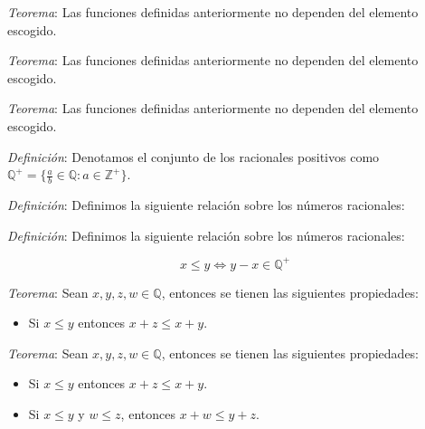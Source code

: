 \documentclass{beamer}
\begin{document}
  \begin{frame}
    \textit{Teorema}: Las funciones definidas anteriormente no dependen del elemento 
    escogido.
  \end{frame}

  \begin{frame}
    \textit{Teorema}: Las funciones definidas anteriormente no dependen del elemento 
    escogido.
  \end{frame}

  \begin{frame}
    \textit{Teorema}: Las funciones definidas anteriormente no dependen del elemento 
    escogido.
    \newline\newline

    \textit{Definición}: Denotamos el conjunto de los racionales positivos
    como $\mathbb{Q}^+ = \{\frac{a}{b} \in \mathbb{Q}:  a \in \mathbb{Z}^+\}$.
  \end{frame}

  \begin{frame}
    \textit{Definición}: Definimos la siguiente relación sobre 
    los números racionales:
  \end{frame}

  \begin{frame}
    \textit{Definición}: Definimos la siguiente relación sobre 
    los números racionales:

    \[x \leq y \iff y - x \in \mathbb{Q}^+\]
  \end{frame}

  \begin{frame}
    \textit{Teorema}: Sean $x, y, z, w \in \mathbb{Q}$, entonces se tienen las siguientes propiedades:

    \begin{itemize}
      \item Si $x \leq y$ entonces $x + z \leq x + y$.
    \end{itemize}
  \end{frame}

  \begin{frame}
    \textit{Teorema}: Sean $x, y, z, w \in \mathbb{Q}$, entonces se tienen las siguientes propiedades:

    \begin{itemize}
      \item Si $x \leq y$ entonces $x + z \leq x + y$.
      \item Si $x \leq y$ y $w \leq z$, entonces $x + w \leq y + z$.
    \end{itemize}
  \end{frame}
\end{document}
